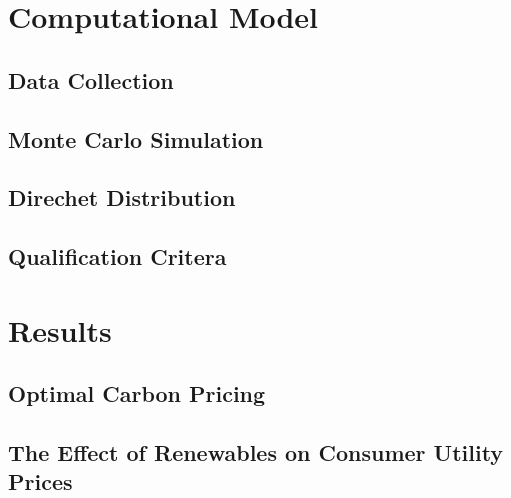 \documentclass{article}
\begin{document}
\section{Computational Model}

\subsection{Data Collection}

\subsection{Monte Carlo Simulation}

\subsection{Direchet Distribution}

\subsection{Qualification Critera}


\section{Results}

\subsection{Optimal Carbon Pricing}

\subsection{The Effect of Renewables on Consumer Utility Prices}

\end{document}
